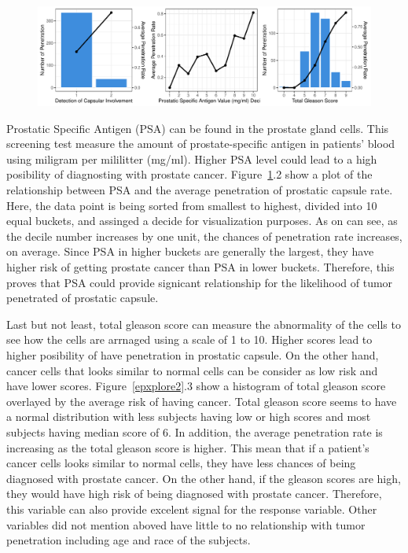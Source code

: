 \documentclass[11pt]{article}\usepackage[]{graphicx}\usepackage[]{color}
\makeatletter
\def\maxwidth{ %
  \ifdim\Gin@nat@width>\linewidth
    \linewidth
  \else
    \Gin@nat@width
  \fi
}
\makeatother
\begin{document}
\begin{figure}[h!] 
\begin{center}

\includegraphics[width=\maxwidth]{figure/unnamed-chunk-2-1} 

\caption{}
\label{explore2}
\end{center} 
\end{figure}

Prostatic Specific Antigen (PSA) can be found in the prostate gland cells. This screening test measure the amount of prostate-specific antigen in patients' blood using miligram per mililitter (mg/ml). Higher PSA level could lead to a high posibility of diagnosting with prostate cancer. Figure~\ref{explore2}.2 show a plot of the relationship between PSA and the average penetration of prostatic capsule rate. Here, the data point is being sorted from smallest to highest, divided into 10 equal buckets, and assinged a decide for visualization purposes. As on can see, as the decile number increases by one unit, the chances of penetration rate increases, on average. Since PSA in higher buckets are generally the largest, they have higher risk of getting prostate cancer than PSA in lower buckets. Therefore, this proves that PSA could provide signicant relationship for the likelihood of tumor penetrated of prostatic capsule. 
\hfill \break

Last but not least, total gleason score can measure the abnormality of the cells to see how the cells are arrnaged using a scale of 1 to 10. Higher scores lead to higher posibility of have penetration in prostatic capsule. On the other hand, cancer cells that looks similar to normal cells can be consider as low risk and have lower scores. Figure~\ref{epxplore2}.3 show a histogram of total gleason score overlayed by the average risk of having cancer. Total gleason score seems to have a normal distribution with less subjects having low or high scores and most subjects having median score of 6. In addition, the average penetration rate is increasing as the total gleason score is higher. This mean that if a patient's cancer cells looks similar to normal cells, they have less chances of being diagnosed with prostate cancer. On the other hand, if the gleason scores are high, they would have high risk of being diagnosed with prostate cancer. Therefore, this variable can also provide excelent signal for the response variable. Other variables did not mention aboved have little to no relationship with tumor penetration including age and race of the subjects.   
\hfill \break
\end{document}
